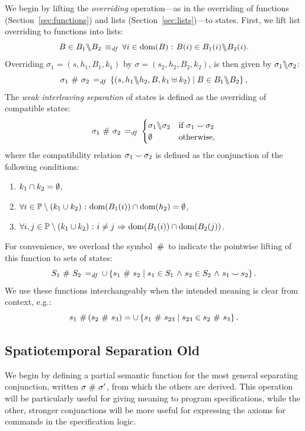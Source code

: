 \documentclass[11pt]{report}
\begin{document}
We begin by lifting the \emph{overriding} operation---as in the overriding of functions (Section~\ref{sec:functions}) and lists (Section~\ref{sec:lists})---to states. First, we lift list overriding to functions into lists: \[ B \in B_1 \backslash\!\!\backslash B_2 \operatorname{\;\equiv_{\mathit{df}}\;} \forall i \in \operatorname{\mathrm{dom}}(B) \operatorname{\,:\,} B(i) \in B_1(i) \backslash\!\!\backslash B_2(i). \] Overriding $\sigma_1 = (s,h_1,B_1,k_1)$ by $\sigma = (s_2,h_2,B_2,k_2)$, is then given by $\sigma_1 \backslash\!\!\backslash \sigma_2$: \[ \sigma_1 \operatorname{\,\#\,} \sigma_2 \operatorname{\;=_{\mathit{df}}\;} \left\lbrace (s,h_1 \backslash\!\!\backslash h_2, B,k_1 \uplus k_2) \mid B \in B_1 \backslash\!\!\backslash B_2 \right\rbrace,\] The \emph{weak interleaving separation} of states is defined as the overriding of compatible states: \[ \sigma_1 \operatorname{\,\#\,} \sigma_2 \operatorname{\;=_{\mathit{df}}\;} \begin{cases}
  \sigma_1 \backslash\!\!\backslash \sigma_2 & \text{if $\sigma_1 \operatorname{\smile} \sigma_2$} \\ 
  \operatorname{\emptyset} & \text{otherwise,} \end{cases} \] where the compatibility relation $\sigma_1 \operatorname{\smile} \sigma_2$ is defined as the conjunction of the following conditions: \begin{enumerate}
  \item $k_1 \cap k_2 = \operatorname{\emptyset}$,
  \item $\forall i \in \mathbb{P} \setminus (k_1 \cup k_2) \operatorname{\,:\,} \operatorname{\mathrm{dom}}(B_1(i)) \cap \operatorname{\mathrm{dom}}(h_2) = \operatorname{\emptyset}$, 
  \item $\forall i,j \in \mathbb{P} \setminus (k_1 \cup k_2) \operatorname{\,:\,} i \neq j \operatorname{\,\Rightarrow\,} \operatorname{\mathrm{dom}}(B_1(i)) \cap \operatorname{\mathrm{dom}}(B_2(j))$. 
\end{enumerate}

For convenience, we overload the symbol $\operatorname{\,\#\,}$ to indicate the pointwise lifting of this function to sets of states: \[ S_1 \operatorname{\,\#\,} S_2 \operatorname{\;=_{\mathit{df}}\;} \cup \left\lbrace s_1 \operatorname{\,\#\,} s_2 \mid s_1 \in S_1 \operatorname{\,\wedge\,} s_2 \in S_2 \operatorname{\,\wedge\,} s_1 \operatorname{\smile} s_2 \right\rbrace.\] We use these functions interchangeably when the intended meaning is clear from context, e.g.: \[ s_1 \operatorname{\,\#\,} (s_2 \operatorname{\,\#\,} s_3) = \cup \left\lbrace s_1 \operatorname{\,\#\,} s_{23} \mid s_{23} \in s_2 \operatorname{\,\#\,} s_3 \right\rbrace.\]


\subsection{Spatiotemporal Separation Old}

We begin by defining a partial semantic function for the most general separating conjunction, written $\sigma \operatorname{\,\#\,} \sigma'$, from which the others are derived. This operation will be particularly useful for giving meaning to program specifications, while the other, stronger conjunctions will be more useful for expressing the axioms for commands in the specification logic. 
\end{document}
